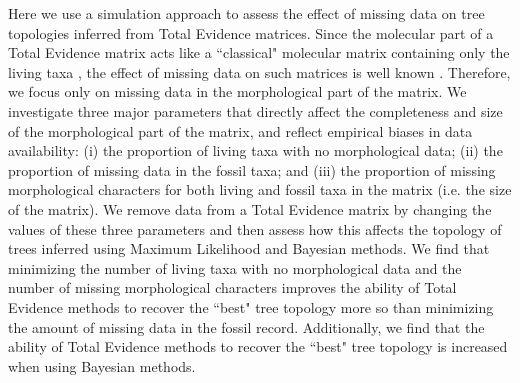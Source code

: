 \documentclass[12pt,letterpaper]{article}
\begin{document}
Here we use a simulation approach to assess the effect of missing data on tree topologies inferred from Total Evidence matrices.
Since the molecular part of a Total Evidence matrix acts like a ``classical" molecular matrix containing only the living taxa \citep{ronquista2012}, the effect of missing data on such matrices is well known \citep{wiensmissing2006,wiensmissing2008,lemmonthe2009,rouresite-specific2011}.
Therefore, we focus only on missing data in the morphological part of the matrix.
We investigate three major parameters that directly affect the completeness and size of the morphological part of the matrix, and reflect empirical biases in data availability: (i) the proportion of living taxa with no morphological data; (ii) the proportion of missing data in the fossil taxa; and (iii) the proportion of missing morphological characters for both living and fossil taxa in the matrix (i.e. the size of the matrix).
We remove data from a Total Evidence matrix by changing the values of these three parameters and then assess how this affects the topology of trees inferred using Maximum Likelihood and Bayesian methods. We find that minimizing the number of living taxa with no morphological data and the number of missing morphological characters improves the ability of Total Evidence methods to recover the ``best" tree topology more so than minimizing the amount of missing data in the fossil record.
Additionally, we find that the ability of Total Evidence methods to recover the ``best" tree topology is increased when using Bayesian methods.


%
%
 
\end{document}

